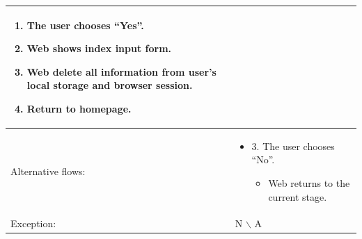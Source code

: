 \begin{table}[]
\begin{tabular}{m{4cm} m{11cm}}
\begin{enumerate}
            \item The user chooses “Yes”.
            \item Web shows index input form.
            \item Web delete all information from user's local storage and browser session.
            \item Return to homepage.
        \end{enumerate}                                                                       \\
        \midrule 
        Alternative flows: & \begin{itemize}
            \item {3. The user chooses “No”.}
                  \begin{itemize}
                      \item Web returns to the current stage.
                  \end{itemize}
        \end{itemize}                                                                       \\ 
        \midrule 
        Exception:         &   N $\backslash$ A                                                  \\ 
        \bottomrule
    \end{tabular}
\end{table}
\clearpage

